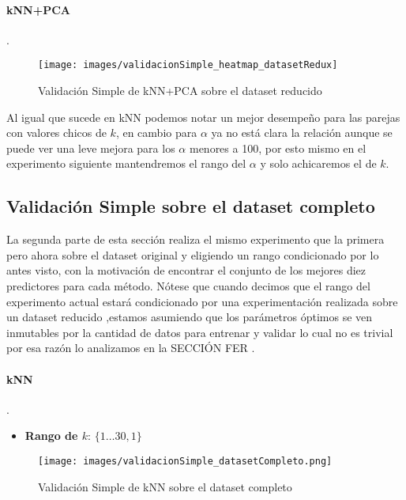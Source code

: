 \paragraph{kNN+PCA}
.
\par 
\begin{figure}[H]
    \centering
    \texttt{[image: images/validacionSimple\_heatmap\_datasetRedux]}%
    \qquad
    \caption{Validación Simple de kNN+PCA sobre el dataset reducido}
    \label{knnpca_preliminar}%
\end{figure}

Al igual que sucede en kNN podemos notar un mejor desempeño para las parejas con valores chicos de $k$, en cambio para $\alpha$ ya no está clara la relación aunque se puede ver una leve mejora para los $\alpha$ menores a 100, por esto mismo en el experimento siguiente mantendremos el rango del $\alpha$ y solo achicaremos el de $k$.

\subsection{Validación Simple sobre el dataset completo}

La segunda parte de esta sección realiza el mismo experimento que la primera pero ahora sobre el dataset original y eligiendo un rango condicionado por lo antes visto, con la motivación de encontrar el conjunto de los mejores diez predictores para cada método. Nótese que cuando decimos que el rango del experimento actual estará condicionado por una experimentación realizada sobre un dataset reducido ,estamos asumiendo que los parámetros óptimos se ven inmutables por la cantidad de datos para entrenar y validar lo cual no es trivial por esa razón lo analizamos en la SECCIÓN FER .


\paragraph{kNN}
.
\begin{itemize}

    \item \textbf{Rango de $k$}: $\{1\dots30, 1\}$


\end{itemize}

\begin{figure}[H]
    \centering
    \texttt{[image: images/validacionSimple\_datasetCompleto.png]}%
    \qquad
    \caption{Validación Simple de kNN sobre el dataset completo}
    \label{knn_valSimple}%
\end{figure}

